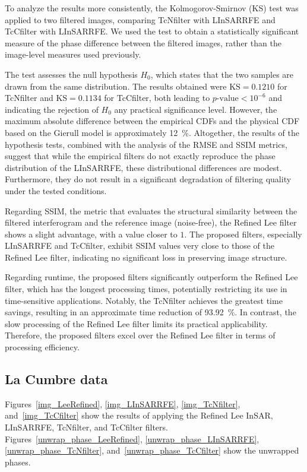\documentclass[remotesensing,article,submit,pdftex,moreauthors]{Definitions/mdpi}
\begin{document}
To analyze the results more consistently, the Kolmogorov-Smirnov (KS) test was applied to two filtered images, comparing TcNfilter with LInSARRFE and TcCfilter with LInSARRFE. We used the test to obtain a statistically significant measure of the phase difference between the filtered images, rather than the image-level measures used previously.

The test assesses the null hypothesis $H_0$, which states that the two samples are drawn from the same distribution. 
The results obtained were $\text{KS} = 0.1210$ for TcNfilter 
and $\text{KS} = 0.1134$ for TcCfilter, both leading to 
$p{\text{-value}}<10^{-6}$ and indicating the rejection of $H_0$ any practical significance level. 
However, the maximum absolute difference between the empirical CDFs and the physical CDF based on the Gierull model is approximately \qty{12}{\percent}. 
Altogether, the results of the hypothesis tests, combined with the analysis of the RMSE and SSIM metrics, suggest that while the empirical filters do not exactly reproduce the phase distribution of the LInSARRFE, these distributional differences are modest. 
Furthermore, they do not result in a significant degradation of filtering quality under the tested conditions.

Regarding SSIM, the metric that evaluates the structural similarity between the filtered interferogram and the reference image (noise-free), the Refined Lee filter shows a slight advantage, with a value closer to $1$. 
The proposed filters, especially LInSARRFE and TcCfilter, exhibit SSIM values very close to those of the Refined Lee filter, indicating no significant loss in preserving image structure. 

Regarding runtime, the proposed filters significantly outperform the Refined Lee filter, which has the longest processing times, potentially restricting its use in time-sensitive applications. 
Notably, the TcNfilter achieves the greatest time savings, resulting in an approximate time reduction of 
\qty{93.92}{\percent}. 
In contrast, the slow processing of the Refined Lee filter limits its practical applicability. 
Therefore, the proposed filters excel over the Refined Lee filter in terms of processing efficiency.

\subsection{La Cumbre data}
\label{LaCumbre}
Figures~\ref{img_LeeRefined}, \ref{img_LInSARRFE}, \ref{img_TcNfilter}, and~\ref{img_TcCfilter} show the results of applying the Refined Lee InSAR, LInSARRFE, TcNfilter, and TcCfilter filters. Figures~\ref{unwrap_phase_LeeRefined}, \ref{unwrap_phase_LInSARRFE}, \ref{unwrap_phase_TcNfilter}, and~\ref{unwrap_phase_TcCfilter} show the unwrapped phases.
\end{document}
